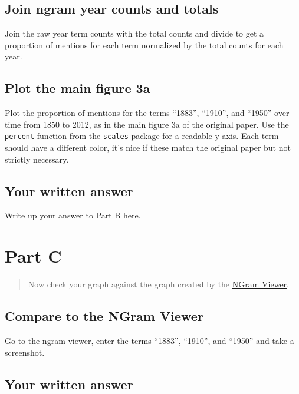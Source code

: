 \documentclass[
]{article}
\begin{document}
\hypertarget{join-ngram-year-counts-and-totals}{%
\subsection{Join ngram year counts and
totals}\label{join-ngram-year-counts-and-totals}}

Join the raw year term counts with the total counts and divide to get a
proportion of mentions for each term normalized by the total counts for
each year.

\hypertarget{plot-the-main-figure-3a}{%
\subsection{Plot the main figure 3a}\label{plot-the-main-figure-3a}}

Plot the proportion of mentions for the terms ``1883'', ``1910'', and
``1950'' over time from 1850 to 2012, as in the main figure 3a of the
original paper. Use the \texttt{percent} function from the
\texttt{scales} package for a readable y axis. Each term should have a
different color, it's nice if these match the original paper but not
strictly necessary.

\hypertarget{your-written-answer-1}{%
\subsection{Your written answer}\label{your-written-answer-1}}

Write up your answer to Part B here.

\hypertarget{part-c}{%
\section{Part C}\label{part-c}}

\begin{quote}
Now check your graph against the graph created by the
\href{https://books.google.com/ngrams/}{NGram Viewer}.
\end{quote}

\hypertarget{compare-to-the-ngram-viewer}{%
\subsection{Compare to the NGram
Viewer}\label{compare-to-the-ngram-viewer}}

Go to the ngram viewer, enter the terms ``1883'', ``1910'', and ``1950''
and take a screenshot.

\hypertarget{your-written-answer-2}{%
\subsection{Your written answer}\label{your-written-answer-2}}
\end{document}
